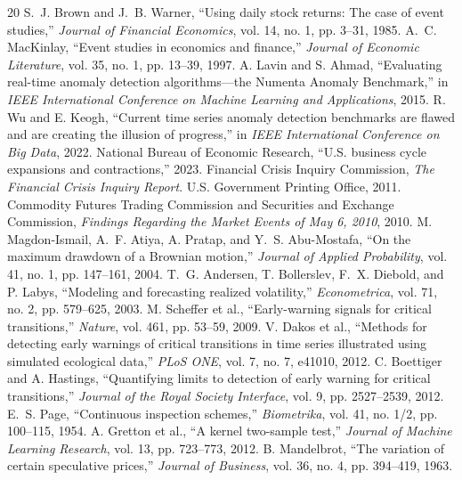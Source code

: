 \documentclass[10pt,twocolumn]{article}
\begin{document}
\begin{thebibliography}{20}
 S.~J. Brown and J.~B. Warner, ``Using daily stock returns: The case of event studies,'' \emph{Journal of Financial Economics}, vol. 14, no. 1, pp. 3--31, 1985.
 A.~C. MacKinlay, ``Event studies in economics and finance,'' \emph{Journal of Economic Literature}, vol. 35, no. 1, pp. 13--39, 1997.
 A. Lavin and S. Ahmad, ``Evaluating real-time anomaly detection algorithms---the Numenta Anomaly Benchmark,'' in \emph{IEEE International Conference on Machine Learning and Applications}, 2015.
 R. Wu and E. Keogh, ``Current time series anomaly detection benchmarks are flawed and are creating the illusion of progress,'' in \emph{IEEE International Conference on Big Data}, 2022.
 National Bureau of Economic Research, ``U.S. business cycle expansions and contractions,'' 2023.
 Financial Crisis Inquiry Commission, \emph{The Financial Crisis Inquiry Report}. U.S. Government Printing Office, 2011.
 Commodity Futures Trading Commission and Securities and Exchange Commission, \emph{Findings Regarding the Market Events of May 6, 2010}, 2010.
 M. Magdon-Ismail, A.~F. Atiya, A. Pratap, and Y.~S. Abu-Mostafa, ``On the maximum drawdown of a Brownian motion,'' \emph{Journal of Applied Probability}, vol. 41, no. 1, pp. 147--161, 2004.
 T.~G. Andersen, T. Bollerslev, F.~X. Diebold, and P. Labys, ``Modeling and forecasting realized volatility,'' \emph{Econometrica}, vol. 71, no. 2, pp. 579--625, 2003.
 M. Scheffer et al., ``Early-warning signals for critical transitions,'' \emph{Nature}, vol. 461, pp. 53--59, 2009.
 V. Dakos et al., ``Methods for detecting early warnings of critical transitions in time series illustrated using simulated ecological data,'' \emph{PLoS ONE}, vol. 7, no. 7, e41010, 2012.
 C. Boettiger and A. Hastings, ``Quantifying limits to detection of early warning for critical transitions,'' \emph{Journal of the Royal Society Interface}, vol. 9, pp. 2527--2539, 2012.
 E.~S. Page, ``Continuous inspection schemes,'' \emph{Biometrika}, vol. 41, no. 1/2, pp. 100--115, 1954.
 A. Gretton et al., ``A kernel two-sample test,'' \emph{Journal of Machine Learning Research}, vol. 13, pp. 723--773, 2012.
 B. Mandelbrot, ``The variation of certain speculative prices,'' \emph{Journal of Business}, vol. 36, no. 4, pp. 394--419, 1963.

\end{thebibliography}
\end{document}
